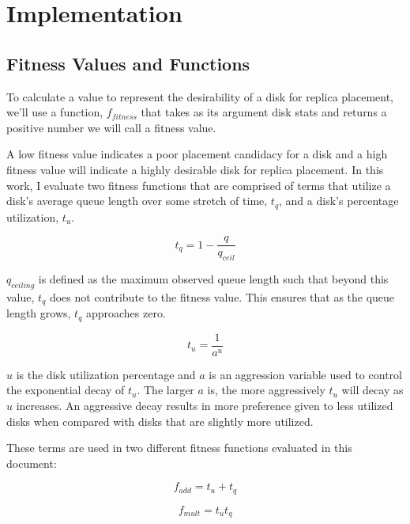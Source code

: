 \documentclass[12pt]{article}
\begin{document}
\newpage
\FloatBarrier
\section{Implementation}

  \subsection{Fitness Values and Functions} \label{section-fitness}

  To calculate a value to represent the desirability of a disk for replica
  placement, we'll use a function, $f_{fitness}$ that takes as its argument
  disk stats and returns a positive number we will call a fitness value.
  
  A low fitness value indicates a poor placement candidacy for a disk and a
  high fitness value will indicate a highly desirable disk for replica
  placement. In this work, I evaluate two fitness functions that are
  comprised of terms that utilize a disk's average queue length over some
  stretch of time, $t_{q}$, and a disk's percentage utilization, $t_{u}$.

  \begin{equation}
    t_{q} = 1 - \frac{q}{q_{ceil}}
  \end{equation}

  $q_{ceiling}$ is defined as the maximum observed queue length such that
  beyond this value, $t_{q}$ does not contribute to the fitness
  value. This ensures that as the queue length grows, $t_{q}$
  approaches zero. 

  \begin{equation}
    t_{u} = \frac{1}{a^{u}}
  \end{equation}

  $u$ is the disk utilization percentage and $a$ is an aggression variable used
  to control the exponential decay of $t_{u}$. The larger $a$ is, the
  more aggressively $t_{u}$ will decay as $u$ increases. An
  aggressive decay results in more preference given to less utilized disks when
  compared with disks that are slightly more utilized.

  These terms are used in two different fitness functions evaluated in this
  document:

  \begin{equation}
    f_{add} = t_{u} + t_{q}
  \end{equation}

  \begin{equation}
    f_{mult} = t_{u}t_{q}
  \end{equation}
\end{document}
